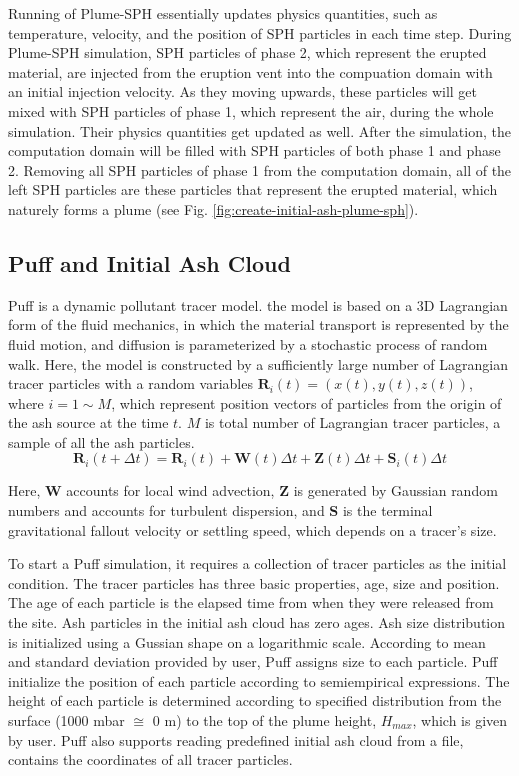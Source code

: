 \documentclass[utf8]{frontiersSCNS} %
\begin{document}
Running of Plume-SPH essentially updates physics quantities, such as temperature, velocity, and the position of SPH particles in each time step. During Plume-SPH simulation, SPH particles of phase 2, which represent the erupted material, are injected from the eruption vent into the compuation domain with an initial injection velocity. As they moving upwards, these particles will get mixed with SPH particles of phase 1, which represent the air, during the whole simulation. Their physics quantities get updated as well. After the simulation, the computation domain will be filled with SPH particles of both phase 1 and phase 2. Removing all SPH particles of phase 1 from the computation domain, all of the left SPH particles are these particles that represent the erupted material, which naturely forms a plume (see  Fig. \ref{fig:create-initial-ash-plume-sph}). 

\subsection{Puff and Initial Ash Cloud} \label{sec:puff-model}
Puff \citep{tanaka1991development,searcy1998puff} is a dynamic pollutant tracer model. the model is based on a 3D Lagrangian form of the fluid mechanics, in which the material transport is represented by the fluid motion, and diffusion is parameterized by a stochastic process of random walk. Here, the model is constructed by a sufficiently large number of  Lagrangian tracer particles with a random variables $\textbf{R}_i(t) = (x(t),y(t),z(t))$, where $ i = \mbox{1} \sim M$, which represent position vectors of particles from the origin of the ash source at the time $t$. $M$ is total number of  Lagrangian tracer particles,  a sample of all the ash particles.
\begin{equation}
\textbf{R}_i(t+\Delta t) = \textbf{R}_i(t) + \textbf{W}(t)\Delta t + \textbf{Z}(t)\Delta t + \textbf{S}_i(t) \Delta t
\label{eq:puff-model}
\end{equation}

Here, $\textbf{W}$ accounts for local wind advection, $\textbf{Z}$  is generated by Gaussian random numbers and accounts for turbulent dispersion, and $\textbf{S}$ is the terminal gravitational fallout velocity or settling speed, which depends on a tracer's size.

To start a Puff simulation, it requires a collection of tracer particles as the initial condition. The tracer particles has three basic properties, age, size and position. The age of each particle is the elapsed time from when they were released from the site. Ash particles in the initial ash cloud has zero ages. Ash size distribution is initialized using a Gussian shape on a logarithmic scale. According to mean and standard deviation provided by user, Puff assigns size to each particle. Puff initialize the position of each particle according to semiempirical expressions. The height of each particle is determined according to specified distribution from the surface (1000 mbar $\cong$ 0 m) to the top of the plume height, $H_{max}$, which is given by user. Puff also supports reading predefined initial ash cloud from a file, contains the coordinates of all tracer particles.
\end{document}
